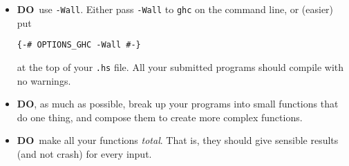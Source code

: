 \documentclass[12pt]{article}
\newcommand{\doo}{\textbf{DO}}
\begin{document}
\begin{itemize}
\item \doo\ use \texttt{-Wall}.  Either pass \texttt{-Wall} to
  \texttt{ghc} on the command line, or (easier) put
\begin{verbatim}
{-# OPTIONS_GHC -Wall #-}
\end{verbatim}
at the top of your \texttt{.hs} file.  All your submitted programs
should compile with no warnings.

\item \doo, as much as possible, break up your programs into small
  functions that do one thing, and compose them to create more complex
  functions.

\item \doo\ make all your functions \emph{total}.  That is, they
  should give sensible results (and not crash) for every input.
\end{itemize}
\end{document}

